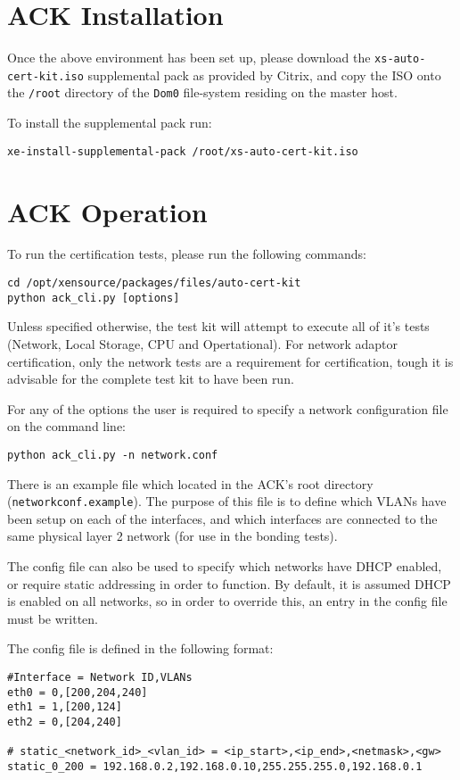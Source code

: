 \documentclass[a4paper,11pt]{article}
\begin{document}
\section{ACK Installation}
Once the above environment has been set up, please download the \verb=xs-auto-cert-kit.iso= supplemental pack as provided by Citrix, and copy the ISO onto the \verb=/root= directory of the \verb=Dom0= file-system residing on the master host.

To install the supplemental pack run:
\begin{verbatim}
xe-install-supplemental-pack /root/xs-auto-cert-kit.iso
\end{verbatim}

\section{ACK Operation}
To run the certification tests, please run the following commands:
\begin{verbatim}
cd /opt/xensource/packages/files/auto-cert-kit
python ack_cli.py [options]
\end{verbatim}

Unless specified otherwise, the test kit will attempt to execute all of it's tests (Network, Local Storage, CPU and Opertational). For network adaptor certification, only the network tests are a requirement for certification, tough it is advisable for the complete test kit to have been run.

For any of the options the user is required to specify a network configuration file on the command line:

\begin{verbatim}
python ack_cli.py -n network.conf
\end{verbatim}

There is an example file which located in the ACK's root directory (\verb=networkconf.example=). The purpose of this file is to define which VLANs have been setup on each of the interfaces, and which interfaces are connected to the same physical layer 2 network (for use in the bonding tests).

The config file can also be used to specify which networks have DHCP enabled, or require static addressing in order to function. By default, it is assumed DHCP is enabled on all networks, so in order to override this, an entry in the config file must be written.

The config file is defined in the following format:

\begin{verbatim}
#Interface = Network ID,VLANs
eth0 = 0,[200,204,240]
eth1 = 1,[200,124]
eth2 = 0,[204,240]

# static_<network_id>_<vlan_id> = <ip_start>,<ip_end>,<netmask>,<gw>
static_0_200 = 192.168.0.2,192.168.0.10,255.255.255.0,192.168.0.1
\end{verbatim}
\end{document}
